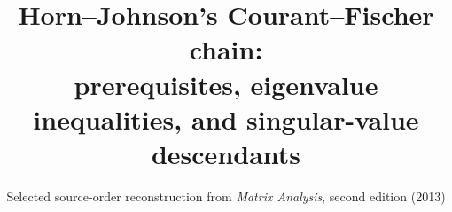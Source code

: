 
\title{Horn--Johnson's Courant--Fischer chain:\\prerequisites, eigenvalue inequalities, and singular-value descendants}
\author{}
\date{Selected source-order reconstruction from \emph{Matrix Analysis}, second edition (2013)}

\newcommand{\RQ}[2]{\mathcal{R}_{#1}(#2)}
\newcommand{\Gr}[2]{\operatorname{Gr}_{#1}(#2)}
\newcommand{\Eig}{\operatorname{Eig}}
\newcommand{\specsumtop}[2]{\Lambda^{\uparrow}_{#1}(#2)}
\newcommand{\specsumbot}[2]{\Lambda^{\downarrow}_{#1}(#2)}
\newcommand{\sv}{\sigma}
\newcommand{\statusmathlib}{\textsf{Mathlib}}
\newcommand{\statuslocal}{\textsf{Repository}}
\newcommand{\statusmissing}{\textsf{Missing}}
\newcommand{\statuspartial}{\textsf{Partial}}
\newenvironment{coveragegrid}{\begin{longtable}{@{}p{0.19\textwidth}p{0.13\textwidth}p{0.29\textwidth}p{0.31\textwidth}@{}}\toprule Item & Status & Existing seam & Remaining obligation \\\midrule\endfirsthead\toprule Item & Status & Existing seam & Remaining obligation \\\midrule\endhead}{\bottomrule\end{longtable}}


\maketitle
\tableofcontents
\clearpage

